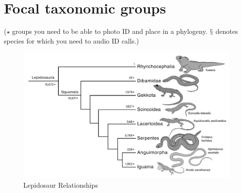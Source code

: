 \documentclass[a4paper,12pt]{article}
\begin{document}
\section*{Focal taxonomic groups} ($\star$ groups you need to be able to photo ID and place in a phylogeny. $\mathsection$ denotes species for which you need to audio ID calls.)
\begin{description}

\begin{figure}[H]
\centering
  \includegraphics[scale=0.4]{Lepidosauria_tre.pdf}
  \caption{Lepidosaur Relationships}
  \label{fig:Lepidosauria}
\end{figure}


\end{description}
\end{document}
